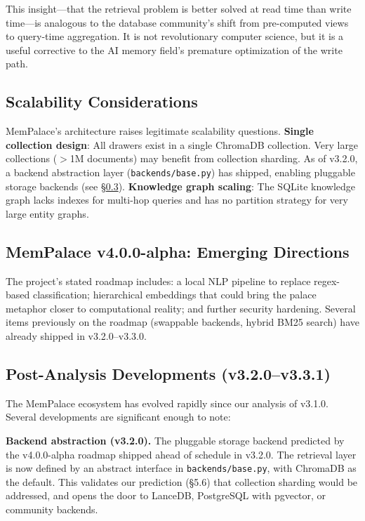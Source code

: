 \documentclass[twoside,11pt]{article}
\begin{document}
This insight---that the retrieval problem is better solved at read time than
write time---is analogous to the database community's shift from pre-computed
views to query-time aggregation.  It is not revolutionary computer science,
but it is a useful corrective to the AI memory field's premature optimization
of the write path.

\subsection{Scalability Considerations}

MemPalace's architecture raises legitimate scalability questions.
\textbf{Single collection design}: All drawers exist in a single ChromaDB
collection.  Very large collections ($>$1M documents) may benefit from
collection sharding.  As of v3.2.0, a backend abstraction layer
(\texttt{backends/base.py}) has shipped, enabling pluggable storage backends
(see \S\ref{sec:postanalysis}).
\textbf{Knowledge graph scaling}: The
SQLite knowledge graph lacks indexes for multi-hop queries and has no partition
strategy for very large entity graphs.

\subsection{MemPalace v4.0.0-alpha: Emerging Directions}

The project's stated roadmap includes: a local NLP pipeline to replace
regex-based classification; hierarchical embeddings that could bring the palace
metaphor closer to computational reality; and further security hardening.
Several items previously on the roadmap (swappable backends, hybrid BM25
search) have already shipped in v3.2.0--v3.3.0.

\subsection{Post-Analysis Developments (v3.2.0--v3.3.1)}
\label{sec:postanalysis}

The MemPalace ecosystem has evolved rapidly since our analysis of v3.1.0.
Several developments are significant enough to note:

\textbf{Backend abstraction (v3.2.0).}  The pluggable storage backend
predicted by the v4.0.0-alpha roadmap shipped ahead of schedule in v3.2.0.
The retrieval layer is now defined by an abstract interface in
\texttt{backends/base.py}, with ChromaDB as the default.  This validates our
prediction (\S5.6) that collection sharding would be addressed, and opens the
door to LanceDB, PostgreSQL with pgvector, or community backends.
\end{document}
